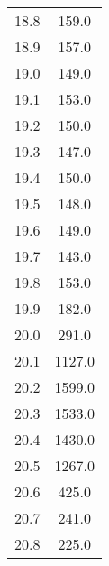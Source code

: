 \begin{table}
{\begin{tabular}{S S}
        18.8 & 159.0 \\
        18.9 & 157.0 \\
        19.0 & 149.0 \\
        19.1 & 153.0 \\
        19.2 & 150.0 \\
        19.3 & 147.0 \\
        19.4 & 150.0 \\
        19.5 & 148.0 \\
        19.6 & 149.0 \\
        19.7 & 143.0 \\
        19.8 & 153.0 \\
        19.9 & 182.0 \\
        20.0 & 291.0 \\
        20.1 & 1127.0 \\
        20.2 & 1599.0 \\
        20.3 & 1533.0 \\
        20.4 & 1430.0 \\
        20.5 & 1267.0 \\
        20.6 & 425.0 \\
        20.7 & 241.0 \\
        20.8 & 225.0 \\
        \bottomrule
    \end{tabular}
    }
\end{table}
